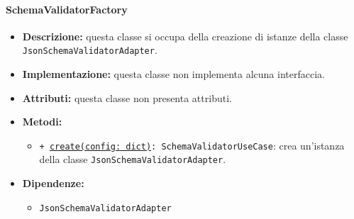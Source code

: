 \paragraph{SchemaValidatorFactory} \label{SchemaValidatorFactory}
\begin{itemize}
    \item \textbf{Descrizione:} questa classe si occupa della creazione di istanze della classe \texttt{JsonSchemaValidatorAdapter}.
    \item \textbf{Implementazione:} questa classe non implementa alcuna interfaccia.
    \item \textbf{Attributi:} questa classe non presenta attributi.
    \item \textbf{Metodi:}
    \begin{itemize}
        \item \texttt{+ \underline{create(config: dict)}: SchemaValidatorUseCase}: crea un'istanza della classe \texttt{JsonSchemaValidatorAdapter}.
    \end{itemize}
    \item \textbf{Dipendenze:}
    \begin{itemize}
        \item \texttt{JsonSchemaValidatorAdapter}
    \end{itemize}
\end{itemize}  